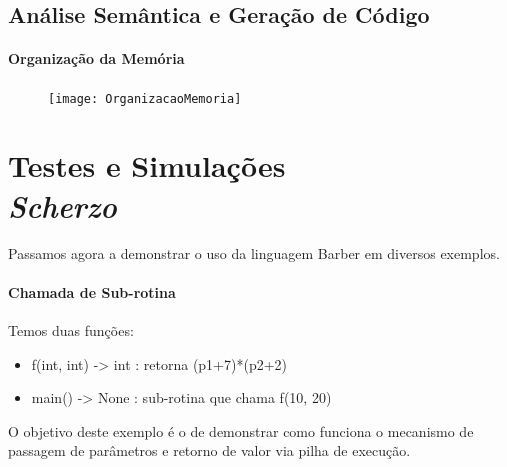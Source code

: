 \documentclass[a4paper,12pt]{report}
\begin{document}
    \chapter*{Análise Semântica e Geração de Código}
    \subsection*{Organização da Memória}
    \begin{figure}[h]
        \centering
        \texttt{[image: OrganizacaoMemoria]}
    \end{figure}



    \part*{Testes e Simulações\\\textit{Scherzo}}
    Passamos agora a demonstrar o uso da linguagem Barber em diversos exemplos.
    
    \subsection*{Chamada de Sub-rotina}
    Temos duas funções:
    \begin{itemize}
        \item f(int, int) -> int : retorna (p1+7)*(p2+2)
        \item main() -> None : sub-rotina que chama f(10, 20)
    \end{itemize}
    O objetivo deste exemplo é o de demonstrar como funciona o mecanismo de passagem de parâmetros e retorno de valor via pilha de execução.
\end{document}
